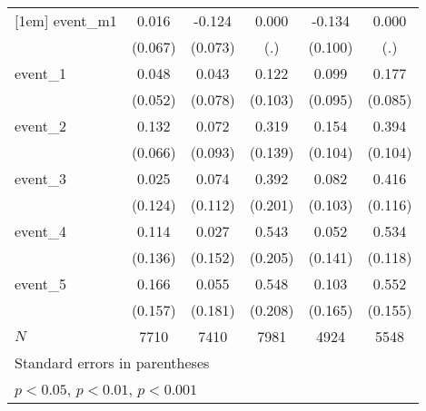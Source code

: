 {\begin{tabular}{l*{5}{c}}
[1em]
event\_m1    &       0.016         &      -0.124         &       0.000         &      -0.134         &       0.000         \\
            &     (0.067)         &     (0.073)         &         (.)         &     (0.100)         &         (.)         \\
[1em]
event\_1     &       0.048         &       0.043         &       0.122         &       0.099         &       0.177\sym{*}  \\
            &     (0.052)         &     (0.078)         &     (0.103)         &     (0.095)         &     (0.085)         \\
[1em]
event\_2     &       0.132\sym{*}  &       0.072         &       0.319\sym{*}  &       0.154         &       0.394\sym{***}\\
            &     (0.066)         &     (0.093)         &     (0.139)         &     (0.104)         &     (0.104)         \\
[1em]
event\_3     &       0.025         &       0.074         &       0.392         &       0.082         &       0.416\sym{***}\\
            &     (0.124)         &     (0.112)         &     (0.201)         &     (0.103)         &     (0.116)         \\
[1em]
event\_4     &       0.114         &       0.027         &       0.543\sym{**} &       0.052         &       0.534\sym{***}\\
            &     (0.136)         &     (0.152)         &     (0.205)         &     (0.141)         &     (0.118)         \\
[1em]
event\_5     &       0.166         &       0.055         &       0.548\sym{**} &       0.103         &       0.552\sym{***}\\
            &     (0.157)         &     (0.181)         &     (0.208)         &     (0.165)         &     (0.155)         \\
\hline
\(N\)       &        7710         &        7410         &        7981         &        4924         &        5548         \\
\hline\hline
\multicolumn{6}{l}{\footnotesize Standard errors in parentheses}\\
\multicolumn{6}{l}{\footnotesize \sym{*} \(p<0.05\), \sym{**} \(p<0.01\), \sym{***} \(p<0.001\)}\\
\end{tabular}
}
